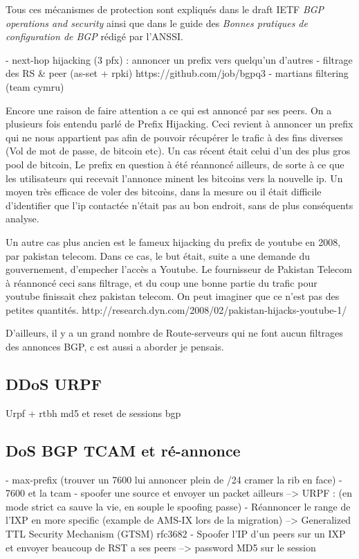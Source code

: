 Tous ces mécanismes de protection sont expliqués dans le draft IETF \emph{BGP operations and security} \cite{fenioux:BGPOPSEC} ainsi que dans le guide des \emph{Bonnes pratiques de configuration de BGP} \cite{fenioux:ANSSIBGP} rédigé par l'ANSSI.

- next-hop hijacking (3 pfx) : annoncer un prefix vers quelqu'un d'autres
- filtrage des RS \& peer (as-set + rpki)  https://github.com/job/bgpq3
- martians filtering (team cymru)

Encore une raison de faire attention a ce qui est annoncé par ses peers. On a plusieurs fois entendu parlé de Prefix Hijacking. Ceci revient à annoncer un prefix qui ne nous appartient pas afin de pouvoir récupérer le trafic à des fins diverses (Vol de mot de passe, de bitcoin etc). Un cas récent était celui d’un des plus gros pool de bitcoin, Le prefix en question à été réannoncé ailleurs, de sorte à ce que les utilisateurs qui recevait l’annonce minent les bitcoins vers la nouvelle ip. Un moyen très efficace de voler des bitcoins, dans la mesure ou il était difficile d’identifier que l’ip contactée n’était pas au bon endroit, sans de plus conséquents analyse. 


Un autre cas plus ancien est le fameux hijacking du prefix de youtube en 2008, par pakistan telecom. Dans ce cas, le but était, suite a une demande du gouvernement, d’empecher l’accès a Youtube. Le fournisseur de Pakistan Telecom à réannoncé ceci sans filtrage, et du coup une bonne partie du trafic pour youtube finissait chez pakistan telecom. On peut imaginer que ce n’est pas des petites quantités.
http://research.dyn.com/2008/02/pakistan-hijacks-youtube-1/


D'ailleurs, il y a un grand nombre de  Route-serveurs qui ne font aucun filtrages des annonces BGP, c est aussi  a aborder je pensais.


\subsection{DDoS URPF}
Urpf + rtbh
md5 et reset de sessions bgp


\subsection{DoS BGP TCAM et ré-annonce}
- max-prefix (trouver un 7600 lui annoncer plein de /24 cramer la rib en face)
- 7600 et la tcam 
- spoofer une source et envoyer un packet ailleurs
--> URPF : (en mode strict ca sauve la vie, en souple le spoofing passe)
- Réannoncer le range de l'IXP en more specific (example de AMS-IX lors de la migration)
--> Generalized TTL Security Mechanism (GTSM) rfc3682
- Spoofer l'IP d'un peers sur un IXP et envoyer beaucoup de RST a ses peers
--> password MD5 sur le session


